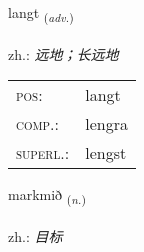 \documentclass[frontgrid, backgrid]{flacards}\usepackage[]{graphicx}\usepackage[]{xcolor}
\begin{document}
\renewcommand{\blhead}{\vskip5pt {\small\bfseries\footnotesize Atviksorð | 副词 }}
\renewcommand{\bcfoot}{\vskip5pt \hspace{2pt}{\small\bfseries\footnotesize 1K}}


{langt \small{\textsubscript{(\textit{adv.})}} \\[1ex] %
\textphonetic{[lauŋ̊t]} \\
zh.: \emph{远地；长远地} \\  [2ex]
\renewcommand*{\arraystretch}{0.8}
\begin{tabular}{ll}
\textsc{pos}: & langt \\ 
\textsc{comp.}: & lengra \\ 
\textsc{superl.}: & lengst \\
\end{tabular}
}

\renewcommand{\flhead}{\vskip5pt \fboxsep=0pt {\small\bfseries\footnotesize Nafnorð | 名词}}
\renewcommand{\fcfoot}{\vskip5pt \fboxsep=0pt \hspace{2pt}{\small\bfseries\footnotesize 1K}}

\renewcommand{\blhead}{\vskip5pt {\small\bfseries\footnotesize Nafnorð | 名词 }}
\renewcommand{\bcfoot}{\vskip5pt \hspace{2pt}{\small\bfseries\footnotesize 1K}}


{markmið \small{\textsubscript{(\textit{n.})}} \\[1ex] %
 \\
zh.: \emph{目标} \\  [2ex]
\renewcommand*{\arraystretch}{0.8}
}

\renewcommand{\flhead}{\vskip5pt \fboxsep=0pt {\small\bfseries\footnotesize Nafnorð | 名词}}
\renewcommand{\fcfoot}{\vskip5pt \fboxsep=0pt \hspace{2pt}{\small\bfseries\footnotesize 1K}}
\end{document}
